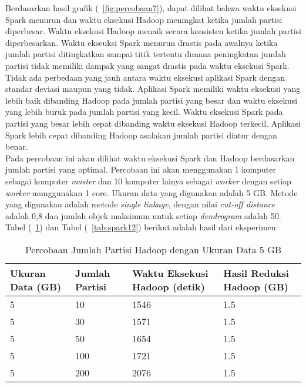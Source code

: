 Berdasarkan hasil grafik (~\ref{fig:percobaan7}), dapat dilihat bahwa waktu eksekusi Spark menurun dan waktu eksekusi Hadoop meningkat ketika jumlah partisi diperbesar. Waktu eksekusi Hadoop menaik secara konsisten ketika jumlah partisi diperbesarkan. Waktu ekseuksi Spark menurun drastis pada awalnya ketika jumlah partisi ditingkatkan sampai titik tertentu dimana peningkatan jumlah partisi tidak memiliki dampak yang sangat drastis pada waktu eksekusi Spark. Tidak ada perbedaan yang jauh antara waktu eksekusi aplikasi Spark dengan standar deviasi maupun yang tidak. Aplikasi Spark memiliki waktu eksekusi yang lebih baik dibanding Hadoop pada jumlah partisi yang besar dan waktu eksekusi yang lebih buruk pada jumlah partisi yang kecil. Waktu eksekusi Spark pada partisi yang besar lebih cepat dibanding waktu eksekusi Hadoop terkecil. Aplikasi Spark lebih cepat dibanding Hadoop asalakan jumlah partisi diatur dengan benar.\\







Pada percobaan ini akan dilihat waktu eksekusi Spark dan Hadoop berdasarkan jumlah partisi yang optimal. Percobaan ini akan menggunakan 1 komputer sebagai komputer \textit{master} dan 10 komputer lainya sebagai \textit{worker} dengan setiap \textit{worker} munggunakan 1 core. Ukuran data yang digunakan adalah 5 GB. Metode yang digunakan adalah metode \textit{single linkage}, dengan nilai \textit{cut-off distance} adalah 0,8 dan jumlah objek maksimum untuk setiap \textit{dendrogram} adalah 50. Tabel (~\ref{tab:spark11}) dan Tabel (~\ref{tab:spark12}) berikut adalah hasil dari eksperimen:





\begin{table}[H] 
	\centering 
	\caption{Percobaan Jumlah Partisi Hadoop dengan Ukuran Data 5 GB}
	\label{tab:spark11}
	\begin{tabular}{|p{3cm}|p{3cm}|p{4cm}|p{4cm}|}
\hline
Ukuran Data (GB) & Jumlah Partisi &  Waktu Eksekusi Hadoop (detik) & Hasil Reduksi Hadoop (GB)\\
\hline
5 & 10 & 1546  & 1.5  \\
\hline
5 & 30 & 1571  & 1.5  \\
\hline
5 & 50 & 1654  & 1.5   \\
\hline
5 & 100 & 1721 & 1.5   \\
\hline
5 & 200 & 2076  & 1.5   \\
\hline


\hline

	\end{tabular} 
\end{table}






